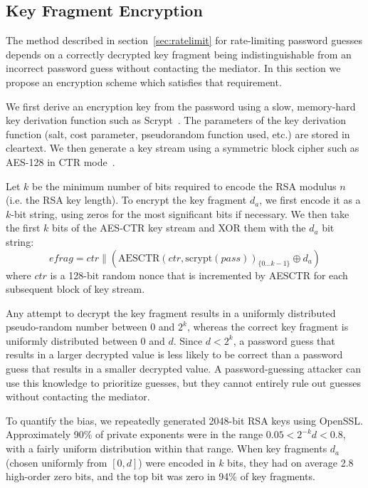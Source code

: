 \documentclass{llncs}
\newcommand*{\concat}{\mathbin{\|}}
\begin{document}
\subsection{Key Fragment Encryption}\label{sec:fragment-encryption}

The method described in section~\ref{sec:ratelimit} for rate-limiting password guesses depends on a
correctly decrypted key fragment being indistinguishable from an incorrect password guess without
contacting the mediator. In this section we propose an encryption scheme which satisfies that
requirement.

We first derive an encryption key from the password using a slow, memory-hard key derivation
function such as Scrypt~\cite{Percival09}. The parameters of the key derivation function (salt, cost
parameter, pseudorandom function used, etc.) are stored in cleartext. We then generate a key stream
using a symmetric block cipher such as AES-128 in CTR mode~\cite{Lipmaa00}.

Let $k$ be the minimum number of bits required to encode the RSA modulus $n$ (i.e. the RSA key
length). To encrypt the key fragment $d_a$, we first encode it as a $k$-bit string, using zeros for
the most significant bits if necessary. We then take the first $k$ bits of the AES-CTR key stream
and XOR them with the $d_a$ bit string:
$$\mathit{efrag} = \mathit{ctr} \concat
    (\mathrm{AESCTR}(\mathit{ctr}, \mathrm{scrypt}(\mathit{pass}))_{\{0 \dots k-1\}} \oplus d_a)$$
where $\mathit{ctr}$ is a 128-bit random nonce that is incremented by AESCTR for each subsequent
block of key stream.

Any attempt to decrypt the key fragment results in a uniformly distributed pseudo-random number
between 0 and $2^k$, whereas the correct key fragment is uniformly distributed between 0 and $d$.
Since $d < 2^k$, a password guess that results in a larger decrypted value is less likely to be
correct than a password guess that results in a smaller decrypted value. A password-guessing
attacker can use this knowledge to prioritize guesses, but they cannot entirely rule out guesses
without contacting the mediator.

To quantify the bias, we repeatedly generated 2048-bit RSA keys using OpenSSL. Approximately 90\% of
private exponents were in the range $0.05 < 2^{-k} d < 0.8$, with a fairly uniform distribution
within that range. When key fragments $d_a$ (chosen uniformly from $[0, d]$) were encoded in $k$
bits, they had on average 2.8 high-order zero bits, and the top bit was zero in 94\% of key
fragments.
\end{document}
